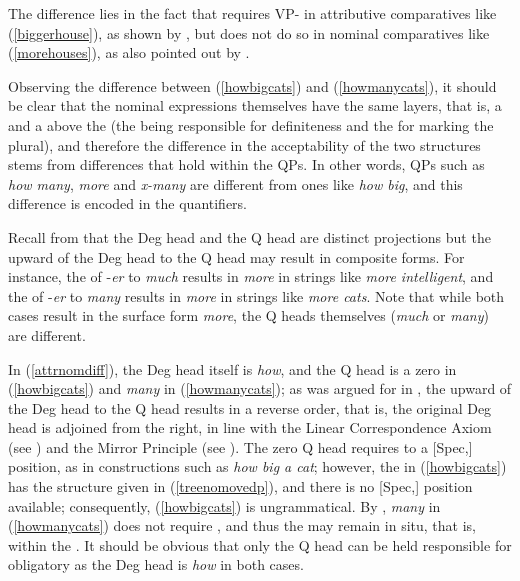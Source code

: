 \ea \label{biggermore}
 \label{biggerhouse}
 \label{morehouses}
\z
\z
	
The difference lies in the fact that  requires VP- in attributive comparatives like (\ref{biggerhouse}), as shown by \citet{kennedymerchant2000}, but does not do so in nominal comparatives like (\ref{morehouses}), as also pointed out by \citet{reglero2006}.

Observing the difference between (\ref{howbigcats}) and (\ref{howmanycats}), it should be clear that the nominal expressions themselves have the same layers, that is, a  and a  above the  (the  being responsible for definiteness and the  for marking the plural), and therefore the difference in the acceptability of the two structures stems from differences that hold within the QPs. In other words, QPs such as \textit{how many}, \textit{more} and \textit{x-many} are different from ones like \textit{how big}, and this difference is encoded in the quantifiers.

Recall from  that the Deg head and the Q head are distinct projections but the upward  of the Deg head to the Q head may result in composite forms. For instance, the  of -\textit{er} to \textit{much} results in \textit{more} in strings like \textit{more intelligent}, and the  of -\textit{er} to \textit{many} results in \textit{more} in strings like \textit{more cats}. Note that while both cases result in the surface form \textit{more}, the Q heads themselves (\textit{much} or \textit{many}) are different.

In (\ref{attrnomdiff}), the Deg head itself is \textit{how}, and the Q head is a zero in (\ref{howbigcats}) and \textit{many} in (\ref{howmanycats}); as was argued for in , the upward  of the Deg head to the Q head results in a reverse order, that is, the original Deg head is adjoined from the right, in line with the Linear Correspondence Axiom (see \citealt{kayne1994}) and the Mirror Principle (see \citealt{baker1985, baker1988}). The zero Q head requires  to a [Spec,] position, as in constructions such as \textit{how big a cat}; however, the  in (\ref{howbigcats}) has the structure given in (\ref{treenomovedp}), and there is no [Spec,] position available; consequently, (\ref{howbigcats}) is ungrammatical. By , \textit{many} in (\ref{howmanycats}) does not require , and thus the  may remain in situ, that is, within the . It should be obvious that only the Q head can be held responsible for obligatory  as the Deg head is \textit{how} in both cases.

